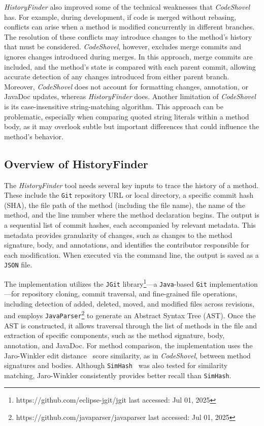 \textit{HistoryFinder} also improved some of the technical weaknesses that \textit{CodeShovel} has. For example, during development, if code is merged without rebasing, conflicts can arise when a method is modified concurrently in different branches. The resolution of these conflicts may introduce changes to the method’s history that must be considered. \textit{CodeShovel}, however, excludes merge commits and ignores changes introduced during merges. In this approach, merge commits are included, and the method’s state is compared with each parent commit, allowing accurate detection of any changes introduced from either parent branch. Moreover, \textit{CodeShovel} does not account for formatting changes, annotation, or JavaDoc updates, whereas \textit{HistoryFinder} does. Another limitation of \textit{CodeShovel} is its case-insensitive string-matching algorithm. This approach can be problematic, especially when comparing quoted string literals within a method body, as it may overlook subtle but important differences that could influence the method's behavior.

\subsection{Overview of HistoryFinder}
The \textit{HistoryFinder} tool needs several key inputs to trace the history of a method. These include the \texttt{Git} repository URL or local directory, a specific commit hash (SHA), the file path of the method (including the file name), the name of the method, and the line number where the method declaration begins. The output is a sequential list of commit hashes, each accompanied by relevant metadata. This metadata provides granularity of changes, such as changes to the method signature, body, and annotations, and identifies the contributor responsible for each modification. When executed via the command line, the output is saved as a \texttt{JSON} file.

The implementation utilizes the \texttt{JGit} library\footnote{https://github.com/eclipse-jgit/jgit last accessed: Jul 01, 2025}—a \texttt{Java}-based \texttt{Git} implementation—for repository cloning, commit traversal, and fine-grained file operations, including detection of added, deleted, moved, and modified files across revisions, and employs \texttt{JavaParser}\footnote{https://github.com/javaparser/javaparser last accessed: Jul 01, 2025} to generate an Abstract Syntax Tree (AST). Once the AST is constructed, it allows traversal through the list of methods in the file and extraction of specific components, such as the method signature, body, annotation, and JavaDoc. For method comparison, the implementation uses the Jaro-Winkler edit distance~\cite{winkler90} score similarity, as in \textit{CodeShovel}, between method signatures and bodies. Although \texttt{SimHash}~\cite{charikar_similarity_2002} was also tested for similarity matching, Jaro-Winkler consistently provides better recall than \texttt{SimHash}.

